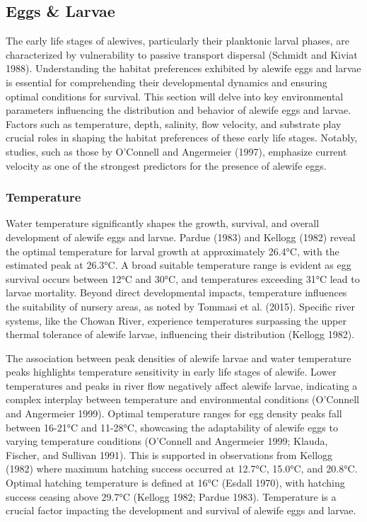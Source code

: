 \documentclass[
]{book}
\begin{document}
\hypertarget{eggs-larvae}{%
\subsection{Eggs \& Larvae}\label{eggs-larvae}}

The early life stages of alewives, particularly their planktonic larval phases, are characterized by vulnerability to passive transport dispersal (Schmidt and Kiviat 1988). Understanding the habitat preferences exhibited by alewife eggs and larvae is essential for comprehending their developmental dynamics and ensuring optimal conditions for survival. This section will delve into key environmental parameters influencing the distribution and behavior of alewife eggs and larvae. Factors such as temperature, depth, salinity, flow velocity, and substrate play crucial roles in shaping the habitat preferences of these early life stages. Notably, studies, such as those by O'Connell and Angermeier (1997), emphasize current velocity as one of the strongest predictors for the presence of alewife eggs.

\hypertarget{temperature-2}{%
\subsubsection{Temperature}\label{temperature-2}}

Water temperature significantly shapes the growth, survival, and overall development of alewife eggs and larvae. Pardue (1983) and Kellogg (1982) reveal the optimal temperature for larval growth at approximately 26.4°C, with the estimated peak at 26.3°C. A broad suitable temperature range is evident as egg survival occurs between 12°C and 30°C, and temperatures exceeding 31°C lead to larvae mortality. Beyond direct developmental impacts, temperature influences the suitability of nursery areas, as noted by Tommasi et al. (2015). Specific river systems, like the Chowan River, experience temperatures surpassing the upper thermal tolerance of alewife larvae, influencing their distribution (Kellogg 1982).

The association between peak densities of alewife larvae and water temperature peaks highlights temperature sensitivity in early life stages of alewife. Lower temperatures and peaks in river flow negatively affect alewife larvae, indicating a complex interplay between temperature and environmental conditions (O'Connell and Angermeier 1999). Optimal temperature ranges for egg density peaks fall between 16-21°C and 11-28°C, showcasing the adaptability of alewife eggs to varying temperature conditions (O'Connell and Angermeier 1999; Klauda, Fischer, and Sullivan 1991). This is supported in observations from Kellogg (1982) where maximum hatching success occurred at 12.7°C, 15.0°C, and 20.8°C. Optimal hatching temperature is defined at 16°C (Esdall 1970), with hatching success ceasing above 29.7°C (Kellogg 1982; Pardue 1983). Temperature is a crucial factor impacting the development and survival of alewife eggs and larvae.
\end{document}
